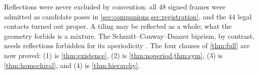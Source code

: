 Reflections were never excluded by convention: all $48$ signed frames were admitted as candidate
poses in \cref{sec:companions,sec:registration}, and the $44$ legal contacts turned out proper.
A tiling may be reflected as a whole; what the geometry forbids is a mixture. The
Schmitt--Conway--Danzer biprism, by contrast, needs reflections forbidden for its aperiodicity
\cite{ST12}. The four clauses of \cref{thm:full} are now proved: (1) is \cref{thm:existence},
(2) is \cref{thm:noperiod,thm:sym}, (3) is \cref{thm:homochiral}, and (4) is
\cref{thm:hierarchy}.
